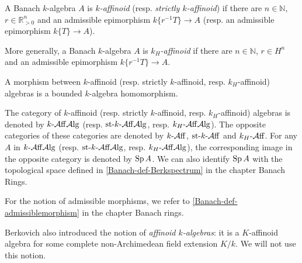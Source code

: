 \begin{definition}
    A Banach $k$-algebra $A$ is \emph{$k$-affinoid} (resp. \emph{strictly $k$-affinoid}) if there are $n\in \mathbb{N}$, $r\in \mathbb{R}^n_{>0}$ and an admissible epimorphism $k\{r^{-1}T\}\rightarrow A$ (resp. an admissible epimorphism $k\{T\}\rightarrow A$).


    More generally, a Banach $k$-algebra $A$ is \emph{$k_H$-affinoid} if there are $n\in \mathbb{N}$, $r\in H^n$  and an admissible epimorphism $k\{r^{-1}T\}\rightarrow A$.

    A morphism between $k$-affinoid (resp. strictly $k$-affinoid, resp. $k_H$-affinoid) algebras is a bounded $k$-algebra homomorphism.

    The category of $k$-affinoid (resp. strictly $k$-affinoid, resp. $k_H$-affinoid) algebras is denoted by $k\text{-}\mathcal{A}\mathrm{ff}\mathcal{A}\mathrm{lg}$ (resp. $\text{st-}k\text{-}\mathcal{A}\mathrm{ff}\mathcal{A}\mathrm{lg}$, resp. $k_H\text{-}\mathcal{A}\mathrm{ff}\mathcal{A}\mathrm{lg}$). The opposite categories of these categories are denoted by $k\text{-}\mathcal{A}\mathrm{ff}$, $\text{st-}k\text{-}\mathcal{A}\mathrm{ff}$ and $k_H\text{-}\mathcal{A}\mathrm{ff}$. For any $A$ in $k\text{-}\mathcal{A}\mathrm{ff}\mathcal{A}\mathrm{lg}$ (resp. $\text{st-}k\text{-}\mathcal{A}\mathrm{ff}\mathcal{A}\mathrm{lg}$, resp. $k_H\text{-}\mathcal{A}\mathrm{ff}\mathcal{A}\mathrm{lg}$), the corresponding image in the opposite category is denoted by $\operatorname{Sp} A$. We can also identify $\operatorname{Sp} A$ with the topological space defined in \cref{Banach-def-Berkspectrum} in the chapter Banach Rings.

\end{definition}
For the notion of admissible morphisms, we refer to \cref{Banach-def-admissiblemorphism} in the chapter Banach rings.
\begin{remark}
    Berkovich also introduced the notion of \emph{affinoid $k$-algebras}: it is a $K$-affinoid algebra for some complete non-Archimedean field extension $K/k$. We will not use this notion.
\end{remark}



